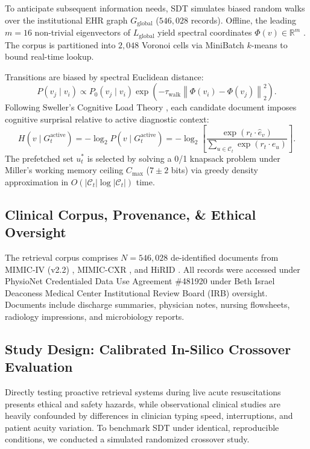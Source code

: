 \documentclass[12pt]{article}
\newcommand{\R}{\mathbb{R}}
\newcommand{\norm}[1]{\left\lVert#1\right\rVert}
\begin{document}
To anticipate subsequent information needs, SDT simulates biased random walks over the institutional EHR graph $G_{\text{global}}$ ($546{,}028$ records). Offline, the leading $m=16$ non-trivial eigenvectors of $L_{\text{global}}$ yield spectral coordinates $\Phi(v) \in \R^m$ \cite{belkin2003laplacian}. The corpus is partitioned into $2{,}048$ Voronoi cells via MiniBatch $k$-means to bound real-time lookup. 

Transitions are biased by spectral Euclidean distance:
\begin{equation}
  P(v_j \mid v_i) \propto P_0(v_j \mid v_i) \exp\!\left( -\tau_{\text{walk}} \norm{\Phi(v_i) - \Phi(v_j)}_2^2 \right).
\end{equation}
Following Sweller's Cognitive Load Theory \cite{sweller1988cognitive,sweller2019cognitive}, each candidate document imposes cognitive surprisal relative to active diagnostic context:
\begin{equation}
  H(v \mid G_t^{\text{active}}) = -\log_2 P(v \mid G_t^{\text{active}}) = -\log_2 \left[ \frac{\exp(r_t \cdot \hat{e}_v)}{\sum_{u \in \mathcal{C}_t} \exp(r_t \cdot \hat{e}_u)} \right].
\end{equation}
The prefetched set $u_t^*$ is selected by solving a 0/1 knapsack problem under Miller's working memory ceiling $C_{\max}$ ($7 \pm 2$ bits) \cite{miller1956magical} via greedy density approximation in $O(|\mathcal{C}_t| \log |\mathcal{C}_t|)$ time.

\subsection*{Clinical Corpus, Provenance, \& Ethical Oversight}

The retrieval corpus comprises $N = 546{,}028$ de-identified documents from MIMIC-IV (v2.2) \cite{johnson2023mimic}, MIMIC-CXR \cite{johnson2019mimiccxr}, and HiRID \cite{hyland2020hirid}. All records were accessed under PhysioNet Credentialed Data Use Agreement \#481920 under Beth Israel Deaconess Medical Center Institutional Review Board (IRB) oversight. Documents include discharge summaries, physician notes, nursing flowsheets, radiology impressions, and microbiology reports.

\subsection*{Study Design: Calibrated In-Silico Crossover Evaluation}

Directly testing proactive retrieval systems during live acute resuscitations presents ethical and safety hazards, while observational clinical studies are heavily confounded by differences in clinician typing speed, interruptions, and patient acuity variation. To benchmark SDT under identical, reproducible conditions, we conducted a simulated randomized crossover study.
\end{document}
